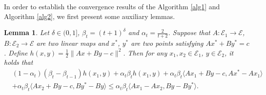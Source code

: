 \documentclass{article}
\numberwithin{equation}{section}
\newtheorem{lemma}{Lemma}[section]
\begin{document}
In order to establish the convergence results of the Algorithm \ref{alg1} and Algorithm  \ref{alg2}, we first present some auxiliary lemmas.
\begin{lemma}   \label{lemma_of_h}
    Let $\delta \in (0,1]$, $\beta_t = (t+1)^{\delta}$ and $\alpha_t=\frac{2}{t+2}$. Suppose that  
    $A: \mathcal{E}_1\rightarrow \mathcal{E}$, $B: \mathcal{E}_2\rightarrow \mathcal{E}$ are two linear maps and $x^*$, $y^*$ are two points satisfying 
    $Ax^*+By^*=c$. Define $h(x,y)=\frac{1}{2}\|Ax+By-c\rVert^2$. Then for any $x_1, x_2\in \mathcal{E}_1$, $y\in\mathcal{E}_2$, it holds that
    \begin{align}
        &(1-\alpha_t)(\beta_{t}-\beta_{t-1})h(x_1,y) + \alpha_t\beta_{t}h(x_1,y) + \alpha_t\beta_{t}\langle Ax_1+By-c,Ax^*-Ax_1\rangle \nonumber \\
        &+ \alpha_t\beta_{t}\langle Ax_2 +By -c, By^* -By\rangle \leq \alpha_t\beta_t \langle Ax_1 -Ax_2, By-By^* \rangle. \nonumber 
    \end{align} 
\end{lemma}
\end{document}
